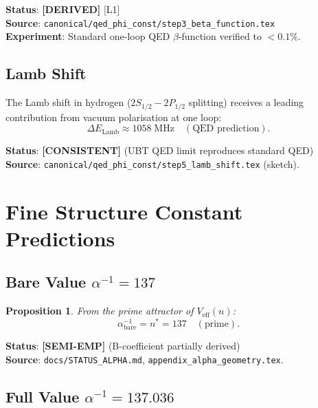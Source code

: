 \documentclass[11pt,a4paper]{article}
\newtheorem{proposition}[theorem]{Proposition}
\theoremstyle{definition}
\theoremstyle{remark}
\begin{document}
\noindent\textbf{Status}: \textbf{[DERIVED]} [L1] \\
\noindent\textbf{Source}: \texttt{canonical/qed\_phi\_const/step3\_beta\_function.tex} \\
\noindent\textbf{Experiment}: Standard one-loop QED $\beta$-function verified to $< 0.1\%$.

\subsection{Lamb Shift}

The Lamb shift in hydrogen ($2S_{1/2} - 2P_{1/2}$ splitting) receives a
leading contribution from vacuum polarisation at one loop:
\begin{equation}
  \Delta E_{\mathrm{Lamb}} \approx 1058\;\mathrm{MHz}
  \quad (\text{QED prediction}).
\end{equation}

\noindent\textbf{Status}: \textbf{[CONSISTENT]} (UBT QED limit reproduces standard QED) \\
\noindent\textbf{Source}: \texttt{canonical/qed\_phi\_const/step5\_lamb\_shift.tex} (sketch).

\section{Fine Structure Constant Predictions}\label{sec:alpha_pred}

\subsection{Bare Value $\alpha^{-1} = 137$}

\begin{proposition}
From the prime attractor of $V_{\mathrm{eff}}(n)$:
\begin{equation}
  \alpha^{-1}_{\mathrm{bare}} = n^* = 137 \quad (\text{prime}).
\end{equation}
\end{proposition}

\noindent\textbf{Status}: \textbf{[SEMI-EMP]} (B-coefficient partially derived) \\
\noindent\textbf{Source}: \texttt{docs/STATUS\_ALPHA.md}, \texttt{appendix\_alpha\_geometry.tex}.

\subsection{Full Value $\alpha^{-1} = 137.036$}
\end{document}
